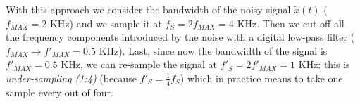 \begin{appendices}
With this approach we consider the bandwidth of the noisy signal $\tilde x(t)$ ($f_{MAX} = 2$ KHz) and we sample it at $f_S = 2 f_{MAX} = 4$ KHz. Then we cut-off all the frequency components introduced by the noise with a digital low-pass filter ($f_{MAX} \rightarrow f'_{MAX} = 0.5$ KHz). Last, since now the bandwidth of the signal is $f'_{MAX} = 0.5$ KHz, we can re-sample the signal at $f'_S = 2 f'_{MAX} = 1$ KHz: this is \emph{under-sampling (1:4)} (because $f'_S = \frac{1}{4} f_S$) which in practice means to take one sample every out of four.


\end{appendices}